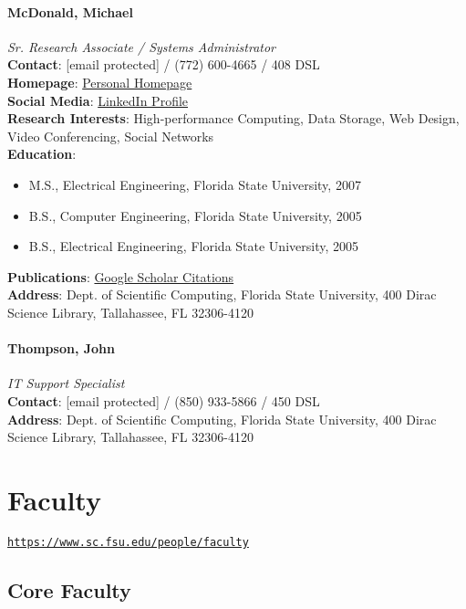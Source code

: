 \documentclass[12pt,a4paper]{article}
\begin{document}
\paragraph{McDonald, Michael}
\textit{Sr. Research Associate / Systems Administrator}\\
\textbf{Contact}: [email protected] / (772) 600-4665 / 408 DSL\\
\textbf{Homepage}: \href{http://people.sc.fsu.edu/~emm2013/}{Personal Homepage}\\
\textbf{Social Media}: \href{https://www.linkedin.com/in/mcdonald/}{LinkedIn Profile}\\
\textbf{Research Interests}: High-performance Computing, Data Storage, Web Design, Video Conferencing, Social Networks\\
\textbf{Education}:
\begin{itemize}
    \item M.S., Electrical Engineering, Florida State University, 2007
    \item B.S., Computer Engineering, Florida State University, 2005
    \item B.S., Electrical Engineering, Florida State University, 2005
\end{itemize}
\textbf{Publications}: \href{https://scholar.google.com/citations?user=GEXo59sAAAAJ}{Google Scholar Citations}\\
\textbf{Address}: Dept. of Scientific Computing, Florida State University, 400 Dirac Science Library, Tallahassee, FL 32306-4120

\paragraph{Thompson, John}
\textit{IT Support Specialist}\\
\textbf{Contact}: [email protected] / (850) 933-5866 / 450 DSL\\
\textbf{Address}: Dept. of Scientific Computing, Florida State University, 400 Dirac Science Library, Tallahassee, FL 32306-4120

\section{Faculty}
\texttt{\url{https://www.sc.fsu.edu/people/faculty}}

\subsection{Core Faculty}
\end{document}
